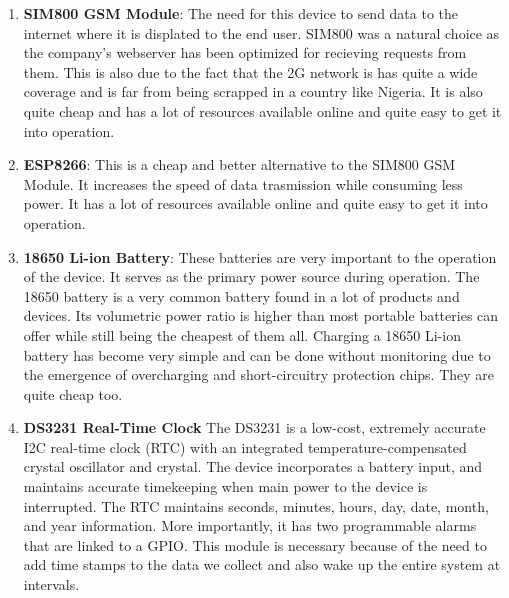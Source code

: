 \begin{enumerate}
\item \textbf{SIM800 GSM Module}: The need for this device to send data to the internet where it is displated to the end  user. SIM800 was a natural choice as the company's webserver has been optimized for recieving requests from them. This is also due to the fact that the 2G network is has quite a wide coverage and is far from being scrapped in a country like Nigeria. It is also quite cheap and has a lot of resources available online and quite easy to get it into operation.
 
\item \textbf{ESP8266}: This is a cheap and better alternative to the SIM800 GSM Module. It increases the speed of data trasmission while consuming less power. It has a lot of resources available online and quite easy to get it into operation.

\item \textbf{18650 Li-ion Battery}: These batteries are very important to the operation of the device. It serves as the primary power source  during operation. The 18650 battery is a very common battery found in a lot of products and devices. Its volumetric power ratio is higher than most portable batteries can offer while still being the cheapest of them all. Charging a 18650 Li-ion battery has become very simple and can be done without monitoring due to the emergence of overcharging and short-circuitry protection chips.  They are quite cheap too. 

\item \textbf{DS3231 Real-Time Clock} The DS3231 is a low-cost, extremely accurate I2C real-time clock (RTC) with an integrated  temperature-compensated crystal oscillator and crystal. The device incorporates a battery input, and  maintains  accurate timekeeping when main  power to the device is interrupted. The RTC maintains seconds, minutes, hours, day, date, month, and year  information. More importantly, it has two programmable alarms that are linked to a GPIO. This module is necessary because of the need to add time stamps to the data we collect and also wake up the entire system at intervals.
\end{enumerate}
